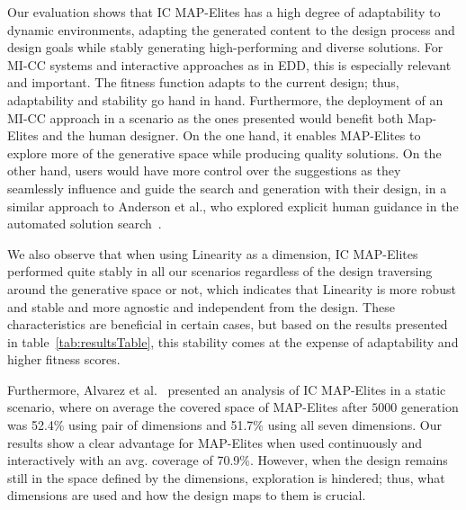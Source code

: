 Our evaluation shows that IC MAP-Elites has a high degree of adaptability to dynamic environments, adapting the generated content to the design process and design goals while stably generating high-performing and diverse solutions. For MI-CC systems and interactive approaches as in EDD, this is especially relevant and important. The fitness function adapts to the current design; thus, adaptability and stability go hand in hand. Furthermore, the deployment of an MI-CC approach in a scenario as the ones presented would benefit both Map-Elites and the human designer. On the one hand, it enables MAP-Elites to explore more of the generative space while producing quality solutions. On the other hand, users would have more control over the suggestions as they seamlessly influence and guide the search and generation with their design, in a similar approach to Anderson et al., who explored explicit human guidance in the automated solution search~\cite{p9anderson2000-humanguidedSearch}. 


We also observe that when using Linearity as a dimension, IC MAP-Elites performed quite stably in all our scenarios regardless of the design traversing around the generative space or not, which indicates that Linearity is more robust and stable and more agnostic and independent from the design. These characteristics are beneficial in certain cases, but based on the results presented in table~\ref{tab:resultsTable}, this stability comes at the expense of adaptability and higher fitness scores.

Furthermore, Alvarez et al.~\cite{p9Alvarez2020-ICMAPE} presented an analysis of IC MAP-Elites in a static scenario, where on average the covered space of MAP-Elites after $5000$ generation was 52.4\% using pair of dimensions and 51.7\% using all seven dimensions. Our results show a clear advantage for MAP-Elites when used continuously and interactively with an avg. coverage of 70.9\%. However, when the design remains still in the space defined by the dimensions, exploration is hindered; thus, what dimensions are used and how the design maps to them is crucial.


